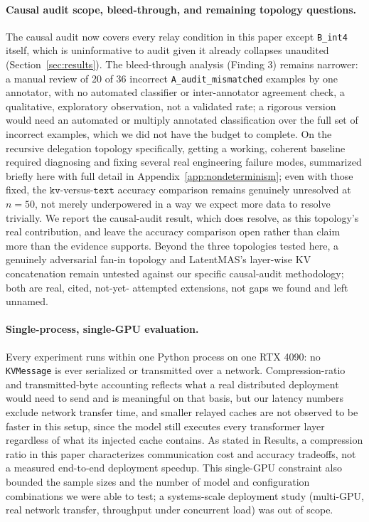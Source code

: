 \documentclass[11pt]{article}
\begin{document}
\paragraph{Causal audit scope, bleed-through, and remaining topology
questions.} The causal audit now covers every relay condition in this
paper except \texttt{B\_int4} itself, which is uninformative to audit
given it already collapses unaudited (Section~\ref{sec:results}). The
bleed-through analysis (Finding 3) remains narrower: a manual review of
20 of 36 incorrect \texttt{A\_audit\_mismatched} examples by one
annotator, with no automated classifier or inter-annotator agreement
check, a qualitative, exploratory observation, not a validated rate; a
rigorous version would need an automated or multiply annotated
classification over the full set of incorrect examples, which we did not
have the budget to complete. On the recursive delegation topology
specifically, getting a working, coherent baseline required diagnosing
and fixing several real engineering failure modes, summarized briefly
here with full detail in Appendix~\ref{app:nondeterminism}; even with
those fixed, the $\texttt{kv}$-versus-$\texttt{text}$ accuracy comparison
remains genuinely unresolved at $n=50$, not merely underpowered in a way
we expect more data to resolve trivially. We report the causal-audit
result, which does resolve, as this topology's real contribution, and
leave the accuracy comparison open rather than claim more than the
evidence supports. Beyond the three topologies tested here, a genuinely
adversarial fan-in topology \citep{latentagentslie2026} and LatentMAS's
layer-wise KV concatenation \citep{latentmas2026} remain untested against
our specific causal-audit methodology; both are real, cited, not-yet-
attempted extensions, not gaps we found and left unnamed.

\paragraph{Single-process, single-GPU evaluation.} Every experiment runs
within one Python process on one RTX 4090: no \texttt{KVMessage} is ever
serialized or transmitted over a network. Compression-ratio and
transmitted-byte accounting reflects what a real distributed deployment
would need to send and is meaningful on that basis, but our latency
numbers exclude network transfer time, and smaller relayed caches are not
observed to be faster in this setup, since the model still executes every
transformer layer regardless of what its injected cache contains. As
stated in Results, a compression ratio in this paper characterizes
communication cost and accuracy tradeoffs, not a measured end-to-end
deployment speedup. This single-GPU constraint also bounded the sample
sizes and the number of model and configuration combinations we were able
to test; a systems-scale deployment study (multi-GPU, real network
transfer, throughput under concurrent load) was out of scope.
\end{document}
